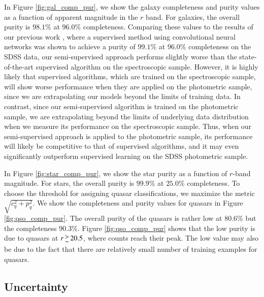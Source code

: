\documentclass[fleqn,usenatbib]{mnras}
\begin{document}
In Figure \ref{fig:gal_comp_pur}, we show the galaxy completeness and purity values as a function of apparent magnitude
in the $r$ band.
For galaxies, the overall purity is $98.1\%$ at $96.0\%$ completeness.
Comparing these values to the results of our previous work \citep{kim2017star},
where a supervised method using convolutional neural networks
was shown to achieve a purity of $99.1\%$ at $96.0\%$ completeness on the SDSS data, our semi-supervised approach
performs slightly worse than the state-of-the-art supervised algorithm on the spectroscopic sample.
However, it is highly likely that supervised algorithms, which are
trained on the spectroscopic sample, will show worse performance when they are applied on the photometric sample,
since we are extrapolating our models beyond the limits of training data.
In contrast, since our semi-supervised algorithm is trained on the photometric sample, we are
extrapolating beyond the limits of underlying data distribution when we measure its performance on
the spectroscopic sample.
Thus, when our semi-supervised approach is applied to the photometric sample, its performance will likely be
competitive to that of supervised algorithms, and it may even significantly outperform supervised learning
on the SDSS photometric sample.

In Figure \ref{fig:star_comp_pur}, we show the star purity as a function of $r$-band magnitude.
For stars, the overall purity is $99.9\%$ at $25.0\%$ completeness.
To choose the threshold for assigning quasar classifications, we maximize the metric $\sqrt{ c_q^2 + p_q^2 }$.
We show the completeness and purity values for quasars in Figure \ref{fig:qso_comp_pur}.
The overall purity of the quasars is rather low at $80.6\%$ but the completeness $90.3\%$.
Figure \ref{fig:qso_comp_pur} shows that the low purity is due to quasars at $r \ga 20.5$,
where counts reach their peak.
The low value may also be due to the fact that there are relatively small number of training examples for quasars.


\subsection{Uncertainty}
\end{document}
